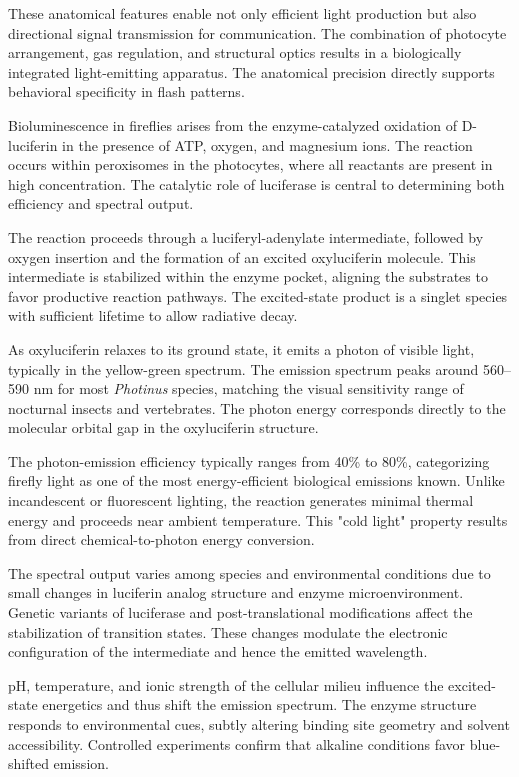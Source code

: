 These anatomical features enable not only efficient light production but also directional signal transmission for communication. The combination of photocyte arrangement, gas regulation, and structural optics results in a biologically integrated light-emitting apparatus. The anatomical precision directly supports behavioral specificity in flash patterns.


Bioluminescence in fireflies arises from the enzyme-catalyzed oxidation of D-luciferin in the presence of ATP, oxygen, and magnesium ions. The reaction occurs within peroxisomes in the photocytes, where all reactants are present in high concentration. The catalytic role of luciferase is central to determining both efficiency and spectral output.

The reaction proceeds through a luciferyl-adenylate intermediate, followed by oxygen insertion and the formation of an excited oxyluciferin molecule. This intermediate is stabilized within the enzyme pocket, aligning the substrates to favor productive reaction pathways. The excited-state product is a singlet species with sufficient lifetime to allow radiative decay.

As oxyluciferin relaxes to its ground state, it emits a photon of visible light, typically in the yellow-green spectrum. The emission spectrum peaks around 560–590 nm for most \emph{Photinus} species, matching the visual sensitivity range of nocturnal insects and vertebrates. The photon energy corresponds directly to the molecular orbital gap in the oxyluciferin structure.

The photon-emission efficiency typically ranges from 40\% to 80\%, categorizing firefly light as one of the most energy-efficient biological emissions known. Unlike incandescent or fluorescent lighting, the reaction generates minimal thermal energy and proceeds near ambient temperature. This "cold light" property results from direct chemical-to-photon energy conversion.

The spectral output varies among species and environmental conditions due to small changes in luciferin analog structure and enzyme microenvironment. Genetic variants of luciferase and post-translational modifications affect the stabilization of transition states. These changes modulate the electronic configuration of the intermediate and hence the emitted wavelength.

pH, temperature, and ionic strength of the cellular milieu influence the excited-state energetics and thus shift the emission spectrum. The enzyme structure responds to environmental cues, subtly altering binding site geometry and solvent accessibility. Controlled experiments confirm that alkaline conditions favor blue-shifted emission.


